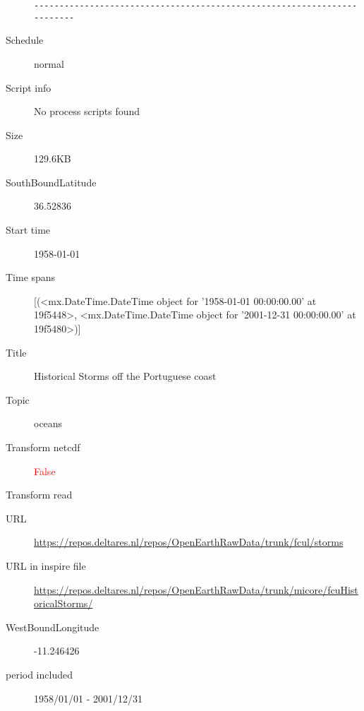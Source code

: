 \documentclass[9]{report}
\begin{document}
\begin{description}
\begin{verbatim}
------------------------------------------------------------------------

\end{verbatim}
  \item[Schedule] normal
  \item[Script info] No process scripts found
  \item[Size] 129.6KB
  \item[SouthBoundLatitude] 36.52836
  \item[Start time] 1958-01-01
  \item[Time spans] [(<mx.DateTime.DateTime object for '1958-01-01 00:00:00.00' at 19f5448>, <mx.DateTime.DateTime object for '2001-12-31 00:00:00.00' at 19f5480>)]
  \item[Title]  Historical Storms off the Portuguese coast 
  \item[Topic] oceans
  \item[Transform netcdf] \textcolor{red}{False}
  \item[Transform read] \textcolor{blue}{}
  \item[URL] \href{https://repos.deltares.nl/repos/OpenEarthRawData/trunk/fcul/storms}{https://repos.deltares.nl/repos/OpenEarthRawData/trunk/fcul/storms}
  \item[URL in inspire file] \href{https://repos.deltares.nl/repos/OpenEarthRawData/trunk/micore/fcuHistoricalStorms/}{https://repos.deltares.nl/repos/OpenEarthRawData/trunk/micore/fcuHistoricalStorms/}
  \item[WestBoundLongitude] -11.246426
  \item[period included] 1958/01/01 - 2001/12/31
\end{description}
\end{document}
